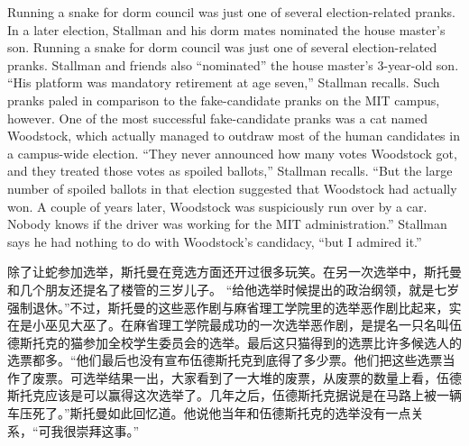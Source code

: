 \ifdefined\eng
\ifdefined\vone
Running a snake for dorm council was just one of several election-related pranks. In a later election, Stallman and his dorm mates nominated the house master's son. 
\fi
\ifdefined\vtwo
Running a snake for dorm council was just one of several election-related pranks. Stallman and friends also ``nominated'' the house master's 3-year-old son.
\fi
``His platform was mandatory retirement at age seven,'' Stallman recalls. Such pranks paled in comparison to the fake-candidate pranks on the MIT campus, however. One of the most successful fake-candidate pranks was a cat named Woodstock, which actually managed to outdraw most of the human candidates in a campus-wide election. ``They never announced how many votes Woodstock got, and they treated those votes as spoiled ballots,'' Stallman recalls. ``But the large number of spoiled ballots in that election suggested that Woodstock had actually won. A couple of years later, Woodstock was suspiciously run over by a car. Nobody knows if the driver was working for the MIT administration.'' Stallman says he had nothing to do with Woodstock's candidacy, ``but I admired it.''
\fi

\ifdefined\chs
\ifdefined\vone
除了让蛇参加选举，斯托曼在竞选方面还开过很多玩笑。在另一次选举中，斯托曼和几个朋友还提名了楼管的三岁儿子。
\fi
``给他选举时候提出的政治纲领，就是七岁强制退休。''不过，斯托曼的这些恶作剧与麻省理工学院里的选举恶作剧比起来，实在是小巫见大巫了。在麻省理工学院最成功的一次选举恶作剧，是提名一只名叫伍德斯托克的猫参加全校学生委员会的选举。最后这只猫得到的选票比许多候选人的选票都多。``他们最后也没有宣布伍德斯托克到底得了多少票。他们把这些选票当作了废票。可选举结果一出，大家看到了一大堆的废票，从废票的数量上看，伍德斯托克应该是可以赢得这次选举了。几年之后，伍德斯托克据说是在马路上被一辆车压死了。''斯托曼如此回忆道。他说他当年和伍德斯托克的选举没有一点关系，``可我很崇拜这事。''
\fi

